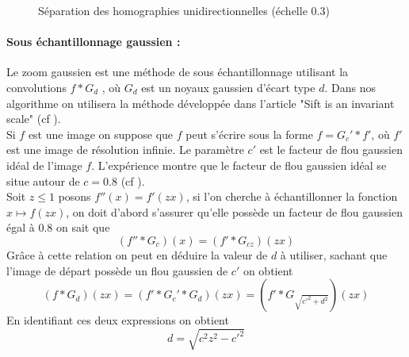 \begin{figure}[h!]
\caption{Séparation des homographies unidirectionnelles (échelle $0.3$) }
\label{image_separation_f14}
\end{figure}

\paragraph{Sous échantillonnage gaussien :}
\label{zoom_gaussien}
Le zoom gaussien est une méthode de sous échantillonnage utilisant la convolutions $f*G_{d}$ , où $G_d$ est un noyaux gaussien d'écart type $d$. Dans nos algorithme on utilisera la méthode développée dans l'article "Sift is an invariant scale" (cf \cite{morel2011sift}).\\
Si $f$ est une image on suppose que $f$ peut s'écrire sous la forme $f=G_c' * f'$, où $f'$ est une image de résolution infinie. Le paramètre $c'$ est le facteur de flou gaussien idéal de l'image $f$. L'expérience montre que le facteur de flou gaussien idéal se situe autour de $c=0.8$ (cf \cite{morel2011sift}).\\
Soit $z\le 1$ posons $f''(x)=f'(zx)$, si l'on cherche à échantillonner la fonction  $x\mapsto f(zx)$,  on doit d'abord s'assurer qu'elle possède un facteur de flou gaussien égal à $0.8$ on sait que 
\begin{equation*}
(f''*G_{c})(x)=(f'*G_{cz})(zx)
\end{equation*}
Grâce à cette relation on peut en déduire la valeur de $d$ à utiliser, sachant que l'image de départ possède un flou gaussien de $c'$ on obtient
\begin{equation*}
(f*G_d)(zx)=(f'*G_c'*G_d)(zx)=(f'*G_{\sqrt{c'^2 + d^2}})(zx)
\end{equation*}
En identifiant ces deux expressions on obtient
\begin{equation}
d=\sqrt{c^2 z^2 - c'^2}
\label{formule_zoom_gaussien}
\end{equation}

